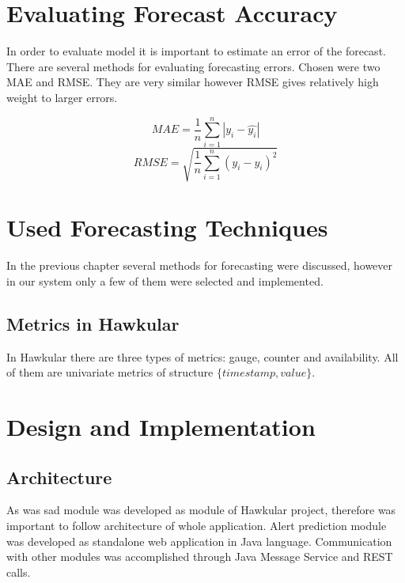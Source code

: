 \chapter{Evaluating Forecast Accuracy}
In order to evaluate model it is important to estimate an error of the forecast. There are 
several methods for evaluating forecasting errors. Chosen were two MAE and RMSE. They are 
very similar however RMSE gives relatively high weight to larger errors.

$$ MAE = \frac{1}{n} \sum_{i=1}^{n} |y_i - \hat{y_i}| $$
$$ RMSE = \sqrt{\frac{1}{n} \sum_{i=1}^{n}(y_i - \hat{y_i})^2} $$

\chapter{Used Forecasting Techniques}
In the previous chapter several methods for forecasting were discussed, however
in our system only a few of them were selected and implemented.

\section{Metrics in Hawkular}
In Hawkular there are three types of metrics: gauge, counter and availability. 
All of them are univariate metrics of structure $ \{timestamp, value\} $.

\chapter{Design and Implementation}
\section{Architecture}
As was sad module was developed as module of Hawkular project, therefore was
important to follow architecture of whole application. Alert prediction module
was developed as standalone web application in Java language. Communication with
other modules was accomplished through Java Message Service and REST calls. 

